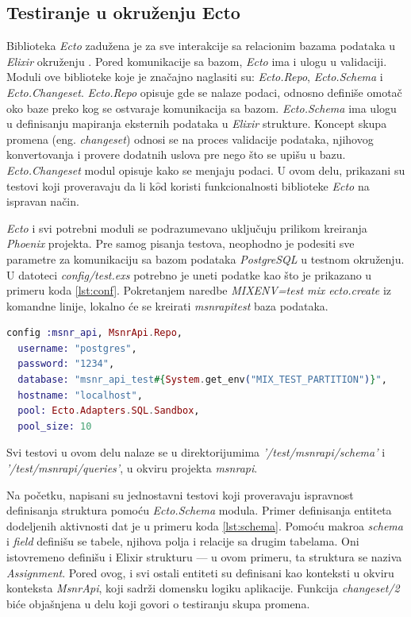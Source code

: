 \documentclass[12pt,oneside]{memoir}
\begin{document}
\subsection{Testiranje u okruženju Ecto}
\par Biblioteka \emph{Ecto} zadužena je za sve interakcije sa relacionim bazama podataka u \emph{Elixir} okruženju \cite{ecto}. Pored komunikacije sa bazom, \emph{Ecto} ima i ulogu u validaciji. Moduli ove biblioteke koje je značajno naglasiti su: \emph{Ecto.Repo}, \emph{Ecto.Schema} i \emph{Ecto.Changeset}. \emph{Ecto.Repo} opisuje gde se nalaze podaci, odnosno definiše omotač oko baze preko kog se ostvaraje komunikacija sa bazom. \emph{Ecto.Schema} ima ulogu u definisanju mapiranja eksternih podataka u \emph{Elixir} strukture. Koncept skupa promena (eng. \emph{changeset}) odnosi se na proces validacije podataka, njihovog konvertovanja i provere dodatnih uslova pre nego što se upišu u bazu. \emph{Ecto.Changeset} modul opisuje kako se menjaju podaci. U ovom delu, prikazani su testovi koji proveravaju da li k$\hat{o}$d koristi funkcionalnosti biblioteke \emph{Ecto} na ispravan način.
\par \emph{Ecto} i svi potrebni moduli se podrazumevano uključuju prilikom kreiranja \emph{Phoenix} projekta. Pre samog pisanja testova, neophodno je podesiti sve parametre za komunikaciju sa bazom podataka \emph{PostgreSQL} u testnom okruženju. U datoteci \emph{config/test.exs} potrebno je uneti podatke kao što je prikazano u primeru koda \ref{lst:conf}. Pokretanjem naredbe \emph{MIX{\textunderscore}ENV=test mix ecto.create} iz komandne linije, lokalno će se kreirati \emph{msnr{\textunderscore}api{\textunderscore}test} baza podataka.

\begin{lstlisting}[language=elixir, caption={Konfiguracija baze podataka u testnom okruženju},captionpos=b, label={lst:conf}]
  config :msnr_api, MsnrApi.Repo,
  username: "postgres",
  password: "1234",
  database: "msnr_api_test#{System.get_env("MIX_TEST_PARTITION")}",
  hostname: "localhost",
  pool: Ecto.Adapters.SQL.Sandbox,
  pool_size: 10
\end{lstlisting}

\par Svi testovi u ovom delu nalaze se u direktorijumima \textit{'/test/msnr{\textunderscore}api/schema'} i \textit{'/test/msnr{\textunderscore}api/queries'}, u okviru projekta \emph{msnr{\textunderscore}api}. 
\par Na početku, napisani su jednostavni testovi koji proveravaju ispravnost definisanja struktura pomoću \emph{Ecto.Schema} modula. Primer definisanja entiteta dodeljenih aktivnosti  dat je u primeru koda \ref{lst:schema}. Pomoću makroa \emph{schema} i \emph{field} definišu se tabele, njihova polja i relacije sa drugim tabelama. Oni istovremeno definišu i Elixir strukturu --- u ovom primeru, ta struktura se naziva \emph{Assignment}. Pored ovog, i svi ostali entiteti su definisani kao konteksti u okviru konteksta \emph{MsnrApi}, koji sadrži domensku logiku aplikacije. Funkcija \emph{changeset/2} biće objašnjena u delu koji govori o testiranju skupa promena.
\end{document}

